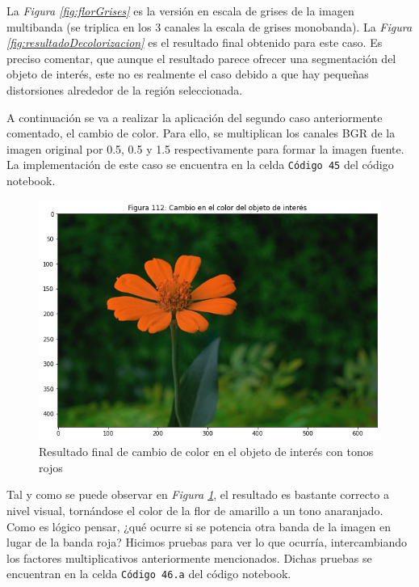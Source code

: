 \documentclass[11pt,twoside,titlepage,a4paper]{article}
\numberwithin{equation}{section} %
\theoremstyle{usual}
\begin{document}
La \textit{Figura \ref{fig:florGrises}} es la versión en escala de grises de la imagen multibanda (se triplica en los 3 canales la escala de grises monobanda). La \textit{Figura \ref{fig:resultadoDecolorizacion}} es el resultado final obtenido para este caso. Es preciso comentar, que aunque el resultado parece ofrecer una segmentación del objeto de interés, este no es  realmente el caso debido a que hay pequeñas distorsiones alrededor de la región seleccionada.

A continuación se va a realizar la aplicación del segundo caso anteriormente comentado, el cambio de color. Para ello, se multiplican los canales BGR de la imagen original por 0.5, 0.5 y 1.5 respectivamente para formar la imagen fuente. La implementación de este caso se encuentra en la celda \texttt{Código 45} del código notebook.

\begin{figure}[h]
    \centering
    \includegraphics[width=.5\textwidth]{imagenes/PoissonImageEditing_cell_111_output_0.png}
    \caption{Resultado final de cambio de color en el objeto de interés con tonos rojos}
    \label{fig:resultadoFlorRoja}
\end{figure}

Tal y como se puede observar en \textit{Figura \ref{fig:resultadoFlorRoja}}, el resultado es bastante correcto a nivel visual, tornándose el color de la flor de amarillo a un tono anaranjado. Como es lógico pensar, ¿qué ocurre si se potencia otra banda de la imagen en lugar de la banda roja? Hicimos pruebas para ver lo que ocurría, intercambiando los factores multiplicativos anteriormente mencionados. Dichas pruebas se encuentran en la celda \texttt{Código 46.a} del código notebook.
\end{document}

